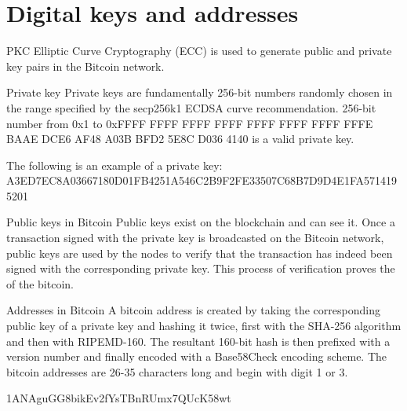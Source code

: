 \documentclass[serif]{beamer}
\begin{document}
	\section{Digital keys and addresses}
	\begin{frame}{PKC}
	Elliptic Curve Cryptography (ECC) is used to generate public and private key pairs in the Bitcoin network.
	\end{frame}
	\begin{frame}{Private key}
		Private keys are fundamentally 256-bit numbers randomly chosen in the range specified by the secp256k1 ECDSA
		curve recommendation. {\color{red}{Any randomly chosen}} 256-bit number from 0x1 to 0xFFFF FFFF FFFF FFFF FFFF FFFF FFFF FFFE
		BAAE DCE6 AF48 A03B BFD2 5E8C D036 4140 is a valid private key.
		\begin{example}
			The following is an example of a private key:
			{\tiny A3ED7EC8A03667180D01FB4251A546C2B9F2FE33507C68B7D9D4E1FA5714195201}
		\end{example}
	\end{frame}
	\begin{frame}{Public keys in Bitcoin}
		Public keys exist on the blockchain and {\color{red}{all network participants}} can see it.  Once a transaction signed with the
		private key is broadcasted on the Bitcoin network, public keys are used by the nodes to verify that the
		transaction has indeed been signed with the corresponding private key. This process of verification proves the
		{\color{red}{ownership}} of the bitcoin.
	\end{frame}
	\begin{frame}{Addresses in Bitcoin}
		A bitcoin address is created by taking the corresponding public key of a private key and hashing it twice, first
		with the SHA-256 algorithm and then with RIPEMD-160. The resultant 160-bit hash is then prefixed with a
		version number and finally encoded with a Base58Check encoding scheme. The bitcoin addresses are 26-35
		characters long and begin with digit 1 or 3.
		\begin{example}
			1ANAguGG8bikEv2fYsTBnRUmx7QUcK58wt
		\end{example}
	\end{frame}
	
\end{document}
